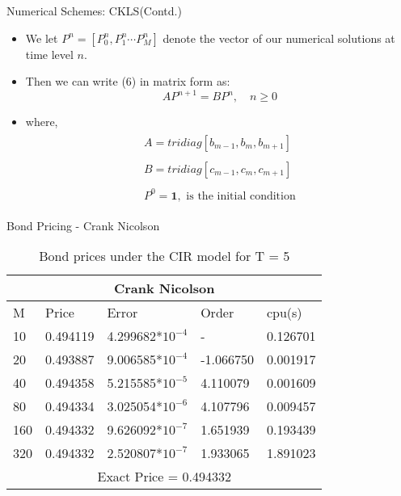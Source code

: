 \documentclass{beamer}
\begin{document}
\begin{frame}{Numerical Schemes: CKLS(Contd.) }
\begin{itemize}
    \item We let $P^{n} = [P_{0}^{n}, P_{1}^{n} \cdots P_{M}^{n}]$ denote the vector of our numerical solutions at time level $n$.
 
\item Then we can write (6) in matrix form as:
\begin{equation*}
    AP^{n+1} = BP^{n}, \quad n \ge 0
\end{equation*}
 
\item where, 
\begin{align*}
    \begin{split}
        A = tridiag[b_{m-1}, b_{m}, b_{m+1}]
    \end{split}\\
    \begin{split}
        B = tridiag[c_{m-1}, c_{m}, c_{m+1}]
    \end{split}\\
    \begin{split}
        P^{0} = \textbf{1}, \mbox{ is the initial condition}
    \end{split}
\end{align*}
 
 
\end{itemize}
 
\end{frame}
 
 
 \begin{frame}{Bond Pricing - Crank Nicolson}
\begin{table}[htp]
\begin{tabular}{ |p{1cm}|p{1.7cm}|p{2.5cm}|p{2cm}|p{1.5cm}|  }

 \hline
 \multicolumn{5}{|c|}{Crank Nicolson} \\
 \hline
 M & Price & Error & Order & cpu(s)\\
 \hline
 10 & 0.494119 & 4.299682*$10^{-4}$ &  - & 0.126701 \\
20 & 0.493887 & 9.006585*$10^{-4}$ & -1.066750 & 0.001917 \\
40 & 0.494358 & 5.215585*$10^{-5}$ & 4.110079 & 0.001609 \\
80 & 0.494334 & 3.025054*$10^{-6}$ & 4.107796 & 0.009457 \\
160 & 0.494332 & 9.626092*$10^{-7}$ & 1.651939 & 0.193439 \\
320 & 0.494332 & 2.520807*$10^{-7}$ & 1.933065 & 1.891023 \\
 \hline
 \multicolumn{5}{|c|}{Exact Price = 0.494332} \\
 \hline
 
\end{tabular}
\caption{ Bond prices under the CIR model for T = 5}

\end{table}

 
\end{frame}
\end{document}
